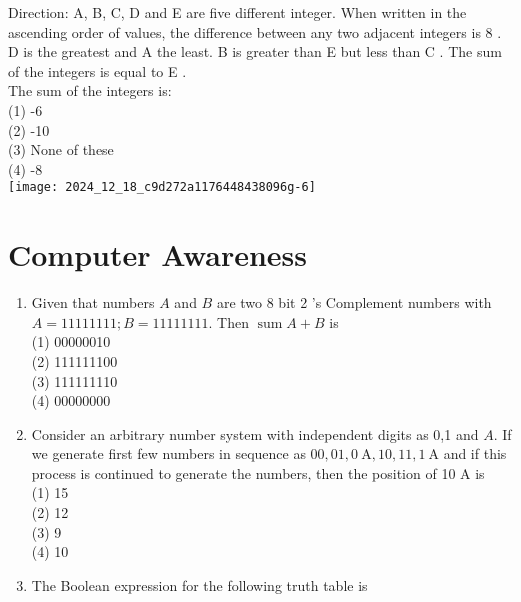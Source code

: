 \documentclass[10pt]{article}
\begin{document}
Direction: A, B, C, D and E are five different integer. When written in the ascending order of values, the difference between any two adjacent integers is 8 . D is the greatest and A the least. B is greater than E but less than C . The sum of the integers is equal to E .\\
The sum of the integers is:\\
(1) -6\\
(2) -10\\
(3) None of these\\
(4) -8\\
\texttt{[image: 2024\_12\_18\_c9d272a1176448438096g-6]}

\section*{Computer Awareness}
\begin{enumerate}
  \item Given that numbers $A$ and $B$ are two 8 bit 2 's Complement numbers with $A=11111111 ; B=11111111$. Then $\operatorname{sum} A+B$ is $\qquad$\\
(1) 00000010\\
(2) 111111100\\
(3) 111111110\\
(4) 00000000
  \item Consider an arbitrary number system with independent digits as 0,1 and $A$. If we generate first few numbers in sequence as $00,01,0 \mathrm{~A}, 10,11,1 \mathrm{~A}$ and if this process is continued to generate the numbers, then the position of 10 A is\\
(1) 15\\
(2) 12\\
(3) 9\\
(4) 10
  \item The Boolean expression for the following truth table is $\qquad$
\end{enumerate}
\end{document}
